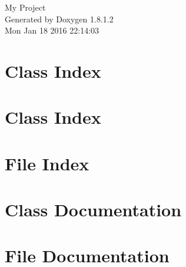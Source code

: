 \documentclass{book}
\begin{document}
\hypersetup{pageanchor=false,citecolor=blue}
\begin{titlepage}
\vspace*{7cm}
\begin{center}
{\Large My Project }\\
\vspace*{1cm}
{\large Generated by Doxygen 1.8.1.2}\\
\vspace*{0.5cm}
{\small Mon Jan 18 2016 22:14:03}\\
\end{center}
\end{titlepage}
\clearemptydoublepage
{}
\tableofcontents
\clearemptydoublepage
{}
\hypersetup{pageanchor=true,citecolor=blue}
\chapter{Class Index}

\chapter{Class Index}

\chapter{File Index}

\chapter{Class Documentation}





















\chapter{File Documentation}






















\printindex
\end{document}
